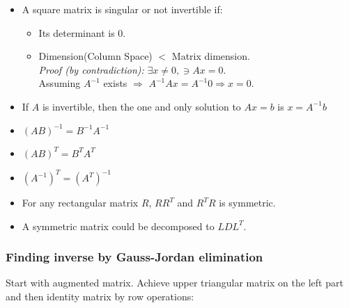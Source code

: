 \begin{itemize}
\item A square matrix is singular or not invertible if:
	\vspace{-6pt}
	\begin{itemize}
	\item Its determinant is $0$.
	\item Dimension(Column Space) $<$ Matrix dimension.\\
	\textit{Proof (by contradiction):} $\exists x \neq 0, \ni Ax = 0$.\\ 
	Assuming $A^{-1}$ exists $\Rightarrow$ $A^{-1}Ax = A^{-1}0 \Rightarrow x = 0$. 
	\end{itemize}

\item If $A$ is invertible, then the one and only solution to $Ax = b$ is $x = A^{-1}b$
\item $(AB)^{-1} = B^{-1}A^{-1}$
\item $(AB)^T = B^TA^T$
\item $(A^{-1})^T = (A^T)^{-1}$
\item For any rectangular matrix $R$, $RR^T$ and $R^TR$ is symmetric.
\item A symmetric matrix could be decomposed to $LDL^T$.
\end{itemize}

\subsubsection{Finding inverse by Gauss-Jordan elimination}


Start with augmented matrix. Achieve upper triangular matrix on the left part and then identity matrix by row operations:\\
\vspace{-4pt}
\begin{center}
\framebox{$[A|I] \longrightarrow [U|X] \longrightarrow [I|A^{-1}]$
}
\end{center}

